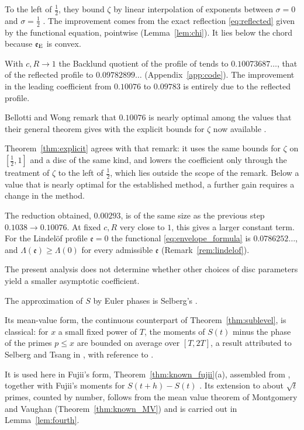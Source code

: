 \documentclass[11pt,a4paper]{article}
\makeatletter
\numberwithin{equation}{section}
\DeclareRobustCommand{\CGref}[1]{\ref{#1}}
\DeclareRobustCommand{\CGeqref}[1]{\eqref{#1}}
\DeclareRobustCommand{\CGcite}[2][]{\if\relax\detokenize{#1}\relax\cite{#2}\else\cite[#1]{#2}\fi}
\let\CG@origref\ref
\let\CG@origeqref\eqref
\newcommand{\CG@gettip}[1]{\@ifundefined{CGTip@#1}{#1}{\csname CGTip@#1\endcsname}}
\newcommand{\CG@getbib}[1]{\@ifundefined{CGBib@#1}{#1}{\csname CGBib@#1\endcsname}}
\DeclareRobustCommand{\CGref}[1]{\pdftooltip{\CG@origref{#1}}{\CG@gettip{#1}}}
\DeclareRobustCommand{\CGeqref}[1]{\pdftooltip{\CG@origeqref{#1}}{\CG@gettip{#1}}}
\DeclareRobustCommand{\CGcite}[2][]{\pdftooltip{\if\relax\detokenize{#1}\relax\cite{#2}\else\cite[#1]{#2}\fi}{\CG@getbib{#2}}}
\theoremstyle{definition}
\theoremstyle{remark}
\newcommand{\eE}{\mathfrak e_{\rm E}}
\makeatother
\begin{document}
To the left of $\frac12$, they bound $\zeta$ by linear interpolation of exponents between $\sigma=0$ and $\sigma=\frac12$ \CGcite[\S3.1]{BellottiWong2025}. The improvement comes from the exact reflection \CGeqref{eq:reflected} given by the functional equation, pointwise (Lemma~\CGref{lem:chi}). It lies below the chord because $\eE$ is convex.

\par
With $c,R\to1$ the Backlund quotient of the profile of \CGcite{BellottiWong2025} tends to $0.10073687\ldots$, that of the reflected profile to $0.09782899\ldots$ (Appendix~\CGref{app:code}). The improvement in the leading coefficient from $0.10076$ to $0.09783$ is entirely due to the reflected profile.

Bellotti and Wong remark that $0.10076$ is nearly optimal among the values that their general theorem gives with the explicit bounds for $\zeta$ now available \CGcite[\S1]{BellottiWong2025}.

Theorem~\CGref{thm:explicit} agrees with that remark: it uses the same bounds for $\zeta$ on $[\frac12,1]$ and a disc of the same kind, and lowers the coefficient only through the treatment of $\zeta$ to the left of $\frac12$, which lies outside the scope of the remark. Below a value that is nearly optimal for the established method, a further gain requires a change in the method.

The reduction obtained, $0.00293$, is of the same size as the previous step $0.1038\to0.10076$. At fixed $c,R$ very close to $1$, this gives a larger constant term. For the Lindel\"of profile $\mathfrak e=0$ the functional \CGeqref{eq:envelope_formula} is $0.0786252\ldots$, and $\Lambda(\mathfrak e)\ge\Lambda(0)$ for every admissible $\mathfrak e$ (Remark~\CGref{rem:lindelof}).

The present analysis does not determine whether other choices of disc parameters yield a smaller asymptotic coefficient.

The approximation of $S$ by Euler phases is Selberg's \CGcite{Selberg1946a}.

Its mean-value form, the continuous counterpart of Theorem~\CGref{thm:sublevel}, is classical: for $x$ a small fixed power of $T$, the moments of $S(t)$ minus the phase of the primes $p\le x$ are bounded on average over $[T,2T]$, a result attributed to Selberg and Tsang in \CGcite[\S3, before (3.6)]{FazzariGerspachMinelli2025}, with reference to \CGcite[Thm.~5.1]{Tsang1984}.

It is used here in Fujii's form, Theorem~\CGref{thm:known_fujii}(a), assembled from \CGcite[\S3]{Fujii1974}, together with Fujii's moments for $S(t+h)-S(t)$ \CGcite[Main Theorem]{Fujii1974}. Its extension to about $\sqrt t$ primes, counted by number, follows from the mean value theorem of Montgomery and Vaughan (Theorem~\CGref{thm:known_MV}) and is carried out in Lemma~\CGref{lem:fourth}.
\end{document}
